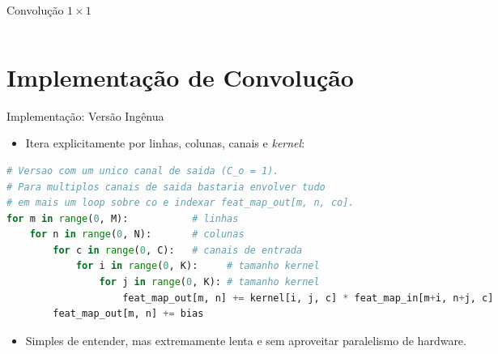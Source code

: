 \documentclass[aspectratio=169,xcolor=dvipsnames]{beamer}
\begin{document}
\begin{frame}{Convolução $1\times 1$}
\begin{columns}[T]
\begin{column}{.5\linewidth}
    \end{column}
\end{columns}
\end{frame}

\section{Implementação de Convolução}

\begin{frame}[fragile]{Implementação: Versão Ingênua}
\begin{itemize}
    \item Itera explicitamente por linhas, colunas, canais e \textit{kernel}:
\end{itemize}
\begin{lstlisting}[style=vscode-light, basicstyle=\ttfamily\scriptsize, language=Python]
# Versao com um unico canal de saida (C_o = 1).
# Para multiplos canais de saida bastaria envolver tudo
# em mais um loop sobre co e indexar feat_map_out[m, n, co].
for m in range(0, M):           # linhas
    for n in range(0, N):       # colunas
        for c in range(0, C):   # canais de entrada
            for i in range(0, K):     # tamanho kernel
                for j in range(0, K): # tamanho kernel
                    feat_map_out[m, n] += kernel[i, j, c] * feat_map_in[m+i, n+j, c]
        feat_map_out[m, n] += bias
\end{lstlisting}
\begin{itemize}
    \item Simples de entender, mas extremamente lenta e sem aproveitar paralelismo de hardware.
\end{itemize}
\end{frame}
\end{document}
